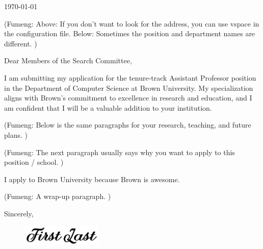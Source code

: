 \documentclass{article}
\newcommand{\fy}[1]{(Fumeng: #1)}
\begin{document}
\makeheader
\makefooter


\mainfont\fontsize{9pt}{9pt}\selectfont

\linespread{1.5} 
\setlength{\parskip}{4pt}

\vspace{1.75em}

 \today
 
 \vspace{1.75em}



\vspace{2.2em}


\fy{Above: If you don't want to look for the address, you can use vspace in the configuration file. Below: Sometimes the position and department names are different. } 

Dear Members of the Search Committee,

I am submitting my application for
the tenure-track Assistant Professor position in the Department of Computer Science at Brown University.
My specialization aligns with 
Brown's commitment to excellence in research and education,
and I am confident that I will be a valuable addition to your institution.

\fy{Below is the same paragraphs for your research, teaching, and future plans. }

\lipsum[4-5]

\fy{The next paragraph usually says why you want to apply to this position / school. }

I apply to Brown University because Brown is awesome.

\fy{A wrap-up paragraph. }

\lipsum[6]













\vspace{4em}

Sincerely,
\begin{figure}[h]
	\includegraphics[height=1cm]{../fig/sign.png}
	\vspace*{-10pt}
\end{figure}

\mynamePhD
\end{document}
